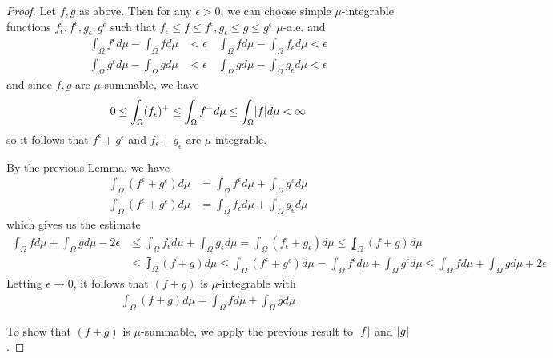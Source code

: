 \begin{proof}
  Let $f,g$ as above.
  Then for any $\epsilon > 0$, we can choose simple $\mu$-integrable functions $f_{\epsilon},f^{\epsilon},g_{\epsilon},g^{\epsilon}$ such that
  $f_{\epsilon} \leq f\leq f^{\epsilon}, g_{\epsilon} \leq g \leq g^{\epsilon}$ $\mu$-a.e.
  and
  \begin{align*}
    \int_{\Omega} f^{\epsilon} d \mu - \int_{\Omega} f d \mu &< \epsilon
    \quad
    \int_{\Omega} f d \mu - \int_{\Omega} f_{\epsilon} d \mu < \epsilon\\
    \int_{\Omega} g^{\epsilon} d \mu - \int_{\Omega} g d \mu &< \epsilon
    \quad
    \int_{\Omega} g d \mu - \int_{\Omega} g_{\epsilon} d \mu < \epsilon
  \end{align*}
  and since $f,g$ are $\mu$-summable, we have
  \begin{align*}
    0 \leq \int_{\Omega} (f_{\epsilon})^{+} \leq \int_{\Omega} f^{-} d \mu \leq \int_{\Omega} \abs{f} d \mu < \infty
  \end{align*}
  so it follows that $f^{\epsilon}+g^{\epsilon}$ and $f_{\epsilon} + g_{\epsilon}$ are $\mu$-integrable.

  By the previous Lemma, we have
  \begin{align*}
    \int_{\Omega} (f^{\epsilon} + g^{\epsilon}) d \mu 
    &= 
    \int_{\Omega} f^{\epsilon} d \mu + \int_{\Omega} g^{\epsilon} d \mu\\
    \int_{\Omega} (f^{\epsilon} + g^{\epsilon}) d \mu 
    &= 
    \int_{\Omega} f_{\epsilon} d \mu + \int_{\Omega} g_{\epsilon} d \mu
  \end{align*}
  which gives us the estimate
  \begin{align*}
    \int_{\Omega} f d \mu + \int_{\Omega} g d \mu - 2 \epsilon 
    &\leq
    \int_{\Omega} f_{\epsilon} d \mu + \int_{\Omega} g_{\epsilon} d \mu
    =
    \int_{\Omega} (f_{\epsilon} + g_{\epsilon}) d \mu
    \leq 
    \lowint_{\Omega} (f + g) d \mu
    \\
    &\leq
    \upint_{\Omega} (f + g) d \mu
    \leq 
    \int_{\Omega} (f^{\epsilon} + g^{\epsilon}) d \mu
    =
    \int_{\Omega} f^{\epsilon} d \mu + \int_{\Omega} g^{\epsilon} d \mu
    \leq
    \int_{\Omega} f d \mu + \int_{\Omega} g d \mu + 2 \epsilon
  \end{align*}
  Letting $\epsilon \to 0$, it follows that $(f + g)$ is $\mu$-integrable with
  \begin{align*}
    \int_{\Omega} (f + g) d \mu = \int_{\Omega} f d \mu + \int_{\Omega} g d \mu
  \end{align*}

  To show that $(f+g)$ is $\mu$-summable, we apply the previous result to $\vert f\vert$ and $\vert g\vert$.

\end{proof}
